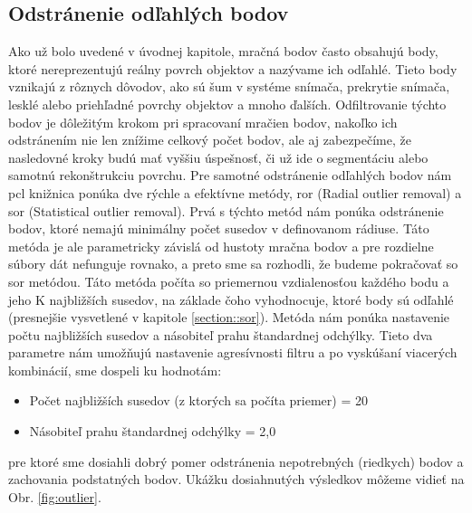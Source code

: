 \subsection{Odstránenie odľahlých bodov}
\noindent Ako už bolo uvedené v úvodnej kapitole, mračná bodov často obsahujú body, ktoré nereprezentujú reálny povrch objektov a nazývame ich odľahlé. Tieto body vznikajú z rôznych dôvodov, ako sú šum v systéme snímača, prekrytie snímača, lesklé alebo priehľadné povrchy objektov a mnoho ďalších. Odfiltrovanie týchto bodov je dôležitým krokom pri spracovaní mračien bodov, nakoľko ich odstránením nie len znížime celkový počet bodov, ale aj zabezpečíme, že nasledovné kroky budú mať vyššiu úspešnosť, či už ide o segmentáciu alebo samotnú rekonštrukciu povrchu. 
\newline\indent Pre samotné odstránenie odľahlých bodov nám \acrshort{pcl} knižnica ponúka dve rýchle a efektívne metódy, \acrshort{ror} (Radial outlier removal) a \acrshort{sor} (Statistical outlier removal). Prvá s týchto metód nám ponúka odstránenie bodov, ktoré nemajú minimálny počet susedov v definovanom rádiuse. Táto metóda je ale parametricky závislá od hustoty mračna bodov a pre rozdielne súbory dát nefunguje rovnako, a preto sme sa rozhodli, že budeme pokračovať so \acrshort{sor} metódou. Táto metóda počíta so priemernou vzdialenosťou každého bodu a jeho K najbližších susedov, na základe čoho vyhodnocuje, ktoré body sú odľahlé (presnejšie vysvetlené v kapitole \ref{section::sor}). 
\newline\indent Metóda nám ponúka nastavenie počtu najbližších susedov a násobiteľ prahu štandardnej odchýlky. Tieto dva parametre nám umožňujú nastavenie agresívnosti filtru a po vyskúšaní viacerých kombinácií, sme dospeli ku hodnotám:
\begin{itemize}
    \setlength\itemsep{0.2em}
    \item Počet najbližších susedov (z ktorých sa počíta priemer) = 20
    \item Násobiteľ prahu štandardnej odchýlky = 2,0
\end{itemize}
pre ktoré sme dosiahli dobrý pomer odstránenia nepotrebných (riedkych) bodov a zachovania podstatných bodov. Ukážku dosiahnutých výsledkov môžeme vidieť na Obr. \ref{fig:outlier}.

